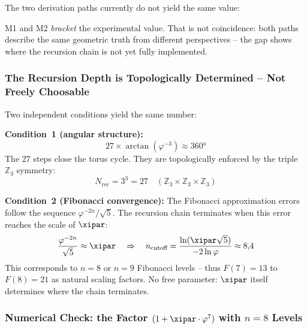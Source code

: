 The two derivation paths currently do not yield the same value:

\begin{center}
{\footnotesize
{}
} %
\end{center}

M1 and M2 \emph{bracket} the experimental value. That is not coincidence: both paths describe the same geometric truth from different perspectives -- the gap shows where the recursion chain is not yet fully implemented.

\subsubsection*{The Recursion Depth is Topologically Determined -- Not Freely Choosable}

Two independent conditions yield the same number:

\textbf{Condition~1 (angular structure):}
\[
  27 \times \arctan(\varphi^{-3}) \approx 360°
\]
The 27 steps close the torus cycle. They are topologically enforced by the triple $\mathbb{Z}_3$ symmetry:
\[
  N_{\text{rec}} = 3^3 = 27 \quad (\mathbb{Z}_3 \times \mathbb{Z}_3 \times \mathbb{Z}_3)
\]

\textbf{Condition~2 (Fibonacci convergence):}
The Fibonacci approximation errors follow the sequence $\varphi^{-2n}/\!\sqrt{5}$. The recursion chain terminates when this error reaches the scale of $\xipar$:
\[
  \frac{\varphi^{-2n}}{\sqrt{5}} \approx \xipar \quad \Rightarrow \quad n_{\text{cutoff}} = \frac{\ln(\xipar\sqrt{5})}{-2\ln\varphi} \approx 8{,}4
\]
This corresponds to $n = 8$ or $n = 9$ Fibonacci levels -- thus $F(7) = 13$ to $F(8) = 21$ as natural scaling factors. No free parameter: $\xipar$ itself determines where the chain terminates.

\subsubsection*{Numerical Check: the Factor $(1 + \xipar\cdot\varphi^7)$ with $n=8$ Levels}


